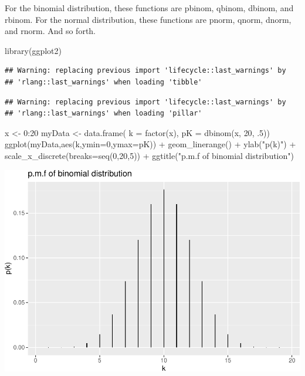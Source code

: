 \documentclass[landscape, 20pt]{extreport}
\newenvironment{Shaded}{\begin{snugshade}}{\end{snugshade}}
\newcommand{\AttributeTok}[1]{\textcolor[rgb]{0.77,0.63,0.00}{#1}}
\newcommand{\DecValTok}[1]{\textcolor[rgb]{0.00,0.00,0.81}{#1}}
\newcommand{\FunctionTok}[1]{\textcolor[rgb]{0.00,0.00,0.00}{#1}}
\newcommand{\NormalTok}[1]{#1}
\newcommand{\OtherTok}[1]{\textcolor[rgb]{0.56,0.35,0.01}{#1}}
\newcommand{\SpecialCharTok}[1]{\textcolor[rgb]{0.00,0.00,0.00}{#1}}
\newcommand{\StringTok}[1]{\textcolor[rgb]{0.31,0.60,0.02}{#1}}
\theoremstyle{definition}
\theoremstyle{definition}
\theoremstyle{definition}
\theoremstyle{definition}
\theoremstyle{remark}
\begin{document}
For the binomial distribution, these functions are pbinom, qbinom, dbinom, and rbinom. For the normal distribution, these functions are pnorm, qnorm, dnorm, and rnorm. And so forth.

\begin{Shaded}
\begin{Highlighting}[]
\FunctionTok{library}\NormalTok{(ggplot2)}
\end{Highlighting}
\end{Shaded}

\begin{verbatim}
## Warning: replacing previous import 'lifecycle::last_warnings' by
## 'rlang::last_warnings' when loading 'tibble'
\end{verbatim}

\begin{verbatim}
## Warning: replacing previous import 'lifecycle::last_warnings' by
## 'rlang::last_warnings' when loading 'pillar'
\end{verbatim}

\begin{Shaded}
\begin{Highlighting}[]
\NormalTok{x }\OtherTok{\textless{}{-}} \DecValTok{0}\SpecialCharTok{:}\DecValTok{20}
\NormalTok{myData }\OtherTok{\textless{}{-}} \FunctionTok{data.frame}\NormalTok{( }\AttributeTok{k =} \FunctionTok{factor}\NormalTok{(x), }\AttributeTok{pK =} \FunctionTok{dbinom}\NormalTok{(x, }\DecValTok{20}\NormalTok{, .}\DecValTok{5}\NormalTok{))}
\FunctionTok{ggplot}\NormalTok{(myData,}\FunctionTok{aes}\NormalTok{(k,}\AttributeTok{ymin=}\DecValTok{0}\NormalTok{,}\AttributeTok{ymax=}\NormalTok{pK)) }\SpecialCharTok{+} 
  \FunctionTok{geom\_linerange}\NormalTok{() }\SpecialCharTok{+} \FunctionTok{ylab}\NormalTok{(}\StringTok{"p(k)"}\NormalTok{) }\SpecialCharTok{+}
  \FunctionTok{scale\_x\_discrete}\NormalTok{(}\AttributeTok{breaks=}\FunctionTok{seq}\NormalTok{(}\DecValTok{0}\NormalTok{,}\DecValTok{20}\NormalTok{,}\DecValTok{5}\NormalTok{)) }\SpecialCharTok{+}   
  \FunctionTok{ggtitle}\NormalTok{(}\StringTok{"p.m.f of binomial distribution"}\NormalTok{)}
\end{Highlighting}
\end{Shaded}

\includegraphics{unnamed-chunk-1-1.pdf}
\end{document}
